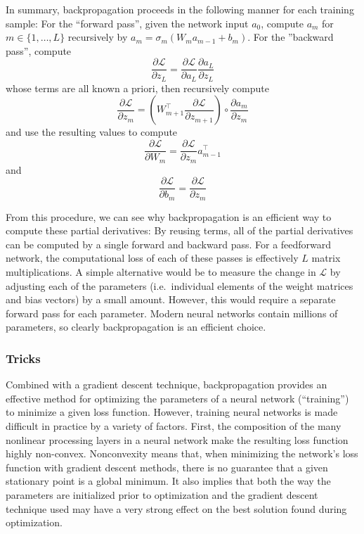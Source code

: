 In summary, backpropagation proceeds in the following manner for each training sample: For the ``forward pass'', given the network input $a_0$, compute $a_m$ for $m \in \{1, \ldots, L\}$ recursively by $a_m = \sigma_m(W_m a_{m - 1} + b_m)$.
For the ''backward pass'', compute
\begin{equation}
\frac{\partial \mathcal{L}}{\partial z_L} = \frac{\partial \mathcal{L}}{\partial a_L} \frac{\partial a_L}{\partial z_L}
\end{equation}
whose terms are all known a priori, then recursively compute
\begin{equation}
        \frac{\partial \mathcal{L}}{\partial z_m} = \left(W_{m + 1}^\top \frac{\partial \mathcal{L}}{\partial z_{m + 1}}\right) \circ \frac{\partial a_m}{\partial z_m}
\end{equation}
and use the resulting values to compute
\begin{equation}
        \frac{\partial \mathcal{L}}{\partial W_m} = \frac{\partial \mathcal{L}}{\partial z_m} a_{m - 1}^\top
\end{equation}
and
\begin{equation}
        \frac{\partial \mathcal{L}}{\partial b_m} = \frac{\partial \mathcal{L}}{\partial z_m}
\end{equation}

From this procedure, we can see why backpropagation is an efficient way to compute these partial derivatives: By reusing terms, all of the partial derivatives can be computed by a single forward and backward pass.
For a feedforward network, the computational loss of each of these passes is effectively $L$ matrix multiplications.
A simple alternative would be to measure the change in $\mathcal{L}$ by adjusting each of the parameters (i.e.\ individual elements of the weight matrices and bias vectors) by a small amount.
However, this would require a separate forward pass for each parameter.
Modern neural networks contain millions of parameters, so clearly backpropagation is an efficient choice.

\subsubsection{Tricks}
\label{sec:tricks}

Combined with a gradient descent technique, backpropagation provides an effective method for optimizing the parameters of a neural network (``training'') to minimize a given loss function.
However, training neural networks is made difficult in practice by a variety of factors.
First, the composition of the many nonlinear processing layers in a neural network make the resulting loss function highly non-convex.
Nonconvexity means that, when minimizing the network's loss function with gradient descent methods, there is no guarantee that a given stationary point is a global minimum.
It also implies that both the way the parameters are initialized prior to optimization and the gradient descent technique used may have a very strong effect on the best solution found during optimization.

